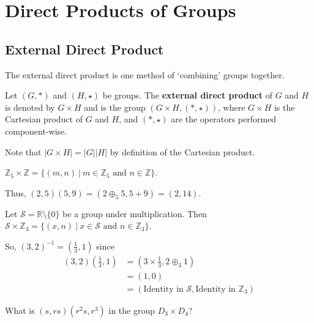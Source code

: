 \chapter{Direct Products of Groups}
\section{External Direct Product}
The external direct product is one method of `combining' groups together.
\begin{definition}
    Let $(G, \ast)$ and $(H, \star)$ be groups. The \textbf{external direct product} of $G$ and $H$ is denoted by $G\times H$ and is the group $(G\times H, (\ast, \star))$, where $G\times H$ is the Cartesian product of $G$ and $H$, and $(\ast, \star)$ are the operators performed component-wise.
\end{definition}
Note that $|G \times H| = |G||H|$ by definition of the Cartesian product.

\begin{example}
    $\mathbb{Z}_5 \times \mathbb{Z} = \{(m,n) \ | \ m \in \mathbb{Z}_5 \text{ and } n \in \mathbb{Z}\}$.

    Thus, $(2, 5)(5, 9) = (2 \oplus_5 5, 5 + 9) = (2, 14)$.
\end{example}

\begin{example}
    Let $\mathcal{S} = \mathbb{R}\setminus\{0\}$ be a group under multiplication. Then $\mathcal{S} \times \mathbb{Z}_3 = \{ (x, n) \ | \ x \in \mathcal{S} \text{ and } n \in \mathbb{Z}_3\}$.

    So, $(3, 2)^{-1} = \left(\frac13, 1\right)$ since
    \begin{align*}
        (3, 2)\left(\frac13, 1\right) &= \left(3 \times \frac13, 2 \oplus_3 1\right)\\
        &= (1, 0)\\
        &= (\text{Identity in }\mathcal{S}, \text{Identity in }\mathbb{Z}_3)
    \end{align*}
\end{example}

\begin{exercise}
    What is $(s, rs)(r^2s, r^3)$ in the group $D_3 \times D_4$?
\end{exercise}

\newpage

